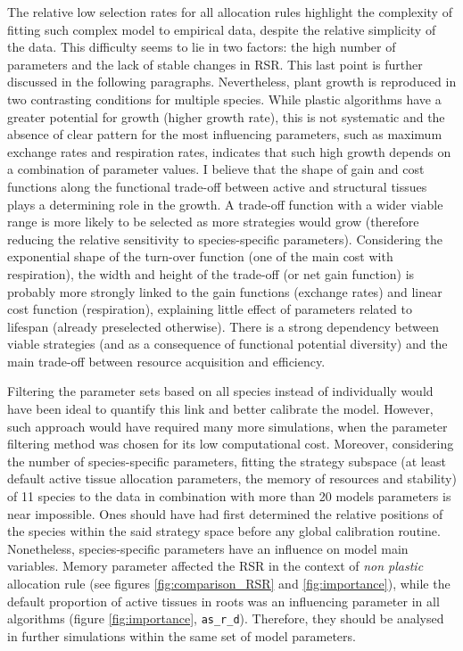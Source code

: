 The relative low selection rates for all allocation rules highlight the complexity of fitting such complex model to empirical data, despite the relative simplicity of the data. This difficulty seems to lie in two factors: the high number of parameters and the lack of stable changes in RSR. This last point is further discussed in the following paragraphs. Nevertheless, plant growth is reproduced in two contrasting conditions for multiple species. While plastic algorithms have a greater potential for growth (higher growth rate), this is not systematic and the absence of clear pattern for the most influencing parameters, such as maximum exchange rates and respiration rates, indicates that such high growth depends on a combination of parameter values. I believe that the shape of gain and cost functions along the functional trade-off between active and structural tissues plays a determining role in the growth. A trade-off function with a wider viable range is more likely to be selected as more strategies would grow (therefore reducing the relative sensitivity to species-specific parameters). Considering the exponential shape of the turn-over function (one of the main cost with respiration), the width and height of the trade-off (or net gain function) is probably more strongly linked to the gain functions (exchange rates) and linear cost function (respiration), explaining little effect of parameters related to lifespan (already preselected otherwise). There is a strong dependency between viable strategies (and as a consequence of functional potential diversity) and the main trade-off between resource acquisition and efficiency.

Filtering the parameter sets based on all species instead of individually would have been ideal to quantify this link and better calibrate the model. However, such approach would have required many more simulations, when the parameter filtering method was chosen for its low computational cost. Moreover, considering the number of species-specific parameters, fitting the strategy subspace (at least default active tissue allocation parameters, the memory of resources and stability) of 11 species to the data in combination with more than 20 models parameters is near impossible. Ones should have had first determined the relative positions of the species within the said strategy space before any global calibration routine. Nonetheless, species-specific parameters have an influence on model main variables. Memory parameter affected the RSR in the context of \textit{non plastic} allocation rule (see figures \ref{fig:comparison_RSR} and \ref{fig:importance}), while the default proportion of active tissues in roots was an influencing parameter in all algorithms (figure \ref{fig:importance}, \texttt{as\_r\_d}). Therefore, they should be analysed in further simulations within the same set of model parameters.

